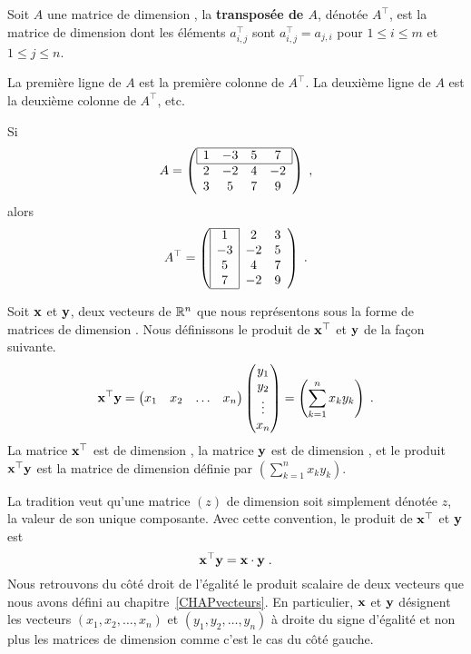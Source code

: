 {\begin{focus}{\dfn} 
Soit $A$ une matrice de dimension , la
{\bfseries transposée de $A$}, dénotée $A^\top$, est la matrice de
dimension  dont les éléments $a_{i,j}^\top$ sont
$a_{i,j}^\top = a_{j,i}$ pour $1 \leq i \leq m$ et $1\leq j \leq n$.
\end{focus}

La première ligne de $A$ est la première colonne de $A^\top$. La
deuxième ligne de $A$ est la deuxième colonne de $A^\top$, etc.

\begin{egg}
Si
\[
A = \left(
\begin{array}{cccc}
\hline
\multicolumn{1}{|c}{1} & -3 & 5 & \multicolumn{1}{c|}{7} \\
\hline
2 & -2 & 4 & -2 \\
3 & 5 & 7 & 9
\end{array}
\right) \; ,
\]
alors
\[
A^\top =
\left(
\begin{array}{ccc}
\cline{1-1}
\multicolumn{1}{|c|}{1} & 2 & 3 \\
\multicolumn{1}{|c|}{-3} & -2 & 5 \\
\multicolumn{1}{|c|}{5} & 4 & 7 \\
\multicolumn{1}{|c|}{7} & -2 & 9 \\
\cline{1-1}
\end{array}
\right) \; .
\]
\end{egg}

Soit $\mathbf{x}$ et $\mathbf{y}$, deux vecteurs de $\mathbb{R}^n$ que nous
représentons sous la forme de matrices de dimension .  Nous
définissons le produit de $\mathbf{x}^\top$ et $\mathbf{y}$ de la façon
suivante.
\[
\mathbf{x}^\top \mathbf{y}
= \begin{pmatrix} x_1 & x_2 & \ldots & x_n \end{pmatrix}
\begin{pmatrix} y_1 \\ y_2 \\ \vdots \\ x_n \end{pmatrix}
= \left( \sum_{k=1}^n x_k y_k \right) \; .
\]
La matrice $\mathbf{x}^\top$ est de dimension , la matrice
$\mathbf{y}$ est de dimension , et le produit
$\mathbf{x}^\top \mathbf{y}$ est la matrice de dimension  définie
par $\displaystyle \left(\sum_{k=1}^n x_k y_k\right)$.

La tradition veut qu'une matrice $\left( z \right)$ de dimension
 soit simplement dénotée $z$, la valeur de son unique
composante.  Avec cette convention, le produit de $\mathbf{x}^\top$ et
$\mathbf{y}$ est
\[
\mathbf{x}^\top \mathbf{y} = \mathbf{x} \cdot \mathbf{y} \; .
\]
Nous retrouvons du côté droit de l'égalité le produit scalaire de deux
vecteurs que nous avons défini au chapitre~\ref{CHAPvecteurs}.  En
particulier, $\mathbf{x}$ et $\mathbf{y}$ désignent les vecteurs
$(x_1,x_2,\ldots,x_n)$ et $(y_1,y_2,\ldots, y_n)$ à droite du signe
d'égalité et non plus les matrices de dimension  comme c'est
le cas du côté gauche.

}
